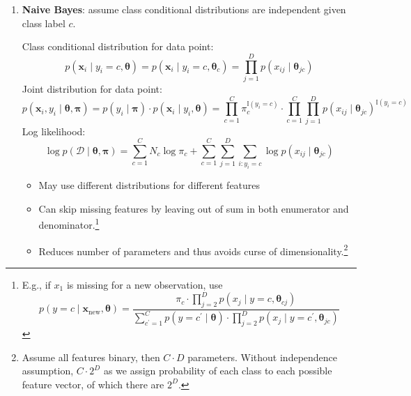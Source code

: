 \documentclass[11pt, %
	oneside, %
	english, %
	onehalfspacing, %
	parskip, %
	]{article} %
\theoremstyle{definition}
\begin{document}
\begin{enumerate}
	\item \textbf{Naive Bayes}: assume class conditional distributions are independent given class label $c$.

	Class conditional distribution for data point:
	\begin{equation*}
		p\left(\mathbf{x}_i \mid y_i=c, \boldsymbol{\theta}\right)=p\left(\mathbf{x}_i \mid y_i=c, \boldsymbol{\theta}_c\right)=\prod_{j=1}^D p\left(x_{i j} \mid \boldsymbol{\theta}_{j c}\right)
	\end{equation*}
	Joint distribution for data point:
	\begin{equation*}
		p\left(\mathbf{x}_i, y_i \mid \boldsymbol{\theta}, \boldsymbol{\pi}\right)=p\left(y_i \mid \boldsymbol{\pi}\right) \cdot p\left(\mathbf{x}_i \mid y_i, \boldsymbol{\theta}\right)=\prod_{c=1}^C \pi_c^{\mathbb{I}\left(y_i=c\right)} \cdot \prod_{c=1}^C \prod_{j=1}^D p\left(x_{i j} \mid \boldsymbol{\theta}_{j c}\right)^{\mathbb{I}\left(y_i=c\right)}
	\end{equation*}
	Log likelihood:
	\begin{equation*}
		\log p(\mathcal{D} \mid \boldsymbol{\theta}, \boldsymbol{\pi})=\sum_{c=1}^C N_c \log \pi_c+\sum_{c=1}^C \sum_{j=1}^D \sum_{i: y_i=c} \log p\left(x_{i j} \mid \boldsymbol{\theta}_{j c}\right)
	\end{equation*}

	\begin{itemize}
		\item May use different distributions for different features
		\item Can skip missing features by leaving out of sum in both enumerator and denominator.\footnote{E.g., if $x_{1}$ is missing for a new observation, use
		\begin{equation*}
			p\left(y=c \mid \mathbf{x}_{\mathrm{new}}, \boldsymbol{\theta}\right)=\frac{\pi_c \cdot \prod_{j=2}^D p\left(x_j \mid y=c, \boldsymbol{\theta}_{c j}\right)}{\sum_{c^{\prime}=1}^C p\left(y=c^{\prime} \mid \boldsymbol{\theta}\right) \cdot \prod_{j=2}^D p\left(x_j \mid y=c^{\prime}, \boldsymbol{\theta}_{j c}\right)}
		\end{equation*}}
		\item Reduces number of parameters and thus avoids curse of dimensionality.\footnote{Assume all features binary, then $C \cdot D$ parameters. Without independence assumption, $C \cdot 2^D$ as we assign probability of each class to each possible feature vector, of which there are $2^D$.}
	\end{itemize}


\end{enumerate}
\end{document}
